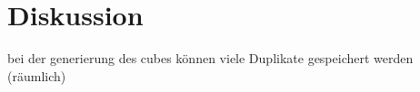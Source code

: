 \section{Diskussion}
\label{diskussion}

bei der generierung des cubes können viele Duplikate gespeichert werden (räumlich)
